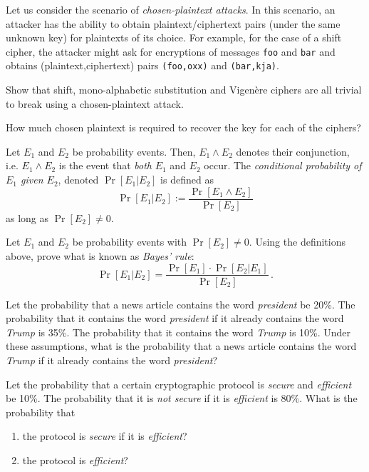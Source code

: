 \documentclass[a4paper,10pt,landscape,twocolumn]{scrartcl}
\begin{document}
\begin{exercise}
Let us consider the scenario of \emph{chosen-plaintext attacks}. In this scenario, an attacker has the ability to obtain plaintext/ciphertext pairs (under the same unknown key) for plaintexts of its choice. For example, for the case of a shift cipher, the attacker might ask for encryptions of messages \texttt{foo} and \texttt{bar} and obtains (plaintext,ciphertext) pairs \texttt{(foo,oxx)} and \texttt{(bar,kja)}.

\begin{subex}
Show that shift, mono-alphabetic substitution and Vigen{\`e}re ciphers are all trivial to break using a chosen-plaintext attack.
\end{subex}

\begin{subex}
How much chosen plaintext is required to recover the key for each of the ciphers?
\end{subex}
\end{exercise}



\begin{exercise}
Let $E_1$ and $E_2$ be probability events. Then, $E_1 \wedge E_2$ denotes their conjunction, i.e. $E_1
    \wedge E_2$ is the event that \emph{both} $E_1$ and $E_2$ occur. The
    \emph{conditional probability of $E_1$ given $E_2$}, denoted
    $\Pr[E_1 | E_2]$ is defined as
    \[ \Pr[E_1 | E_2] := \frac{ \Pr[E_1 \wedge E_2] }{\Pr[E_2]} \]
    as long as $\Pr[E_2] \neq 0$.

\begin{subex}
Let $E_1$ and $E_2$ be probability events with $\Pr[E_2] \neq 0$. Using the definitions above, prove what is known as \emph{Bayes' rule}:
\[ \Pr[E_1 | E_2] = \frac{ \Pr[E_1] \cdot \Pr[E_2 | E_1] }{\Pr[E_2]} \, . \]
\end{subex}

\begin{subex} Let the probability that a news article contains the word
    \emph{president} be 20\%. The probability that it contains the word
    \emph{president} if it already contains the word \emph{Trump} is
    35\%. The probability that it contains the word \emph{Trump} is 10\%.
    Under these assumptions, what is the probability that a news article
    contains the word \emph{Trump} if it already contains the word \emph{president}?
\end{subex}

\begin{subex} Let the probability that a certain cryptographic protocol is
    \emph{secure} and \emph{efficient} be 10\%. The probability that it is
    \emph{not secure} if it is \emph{efficient} is 80\%. What is the
    probability that
    \begin{enumerate}
      \item the protocol is \emph{secure} if it is \emph{efficient}?
      \item the protocol is \emph{efficient}?
    \end{enumerate}
\end{subex}  

\end{exercise}
  
\end{document}
